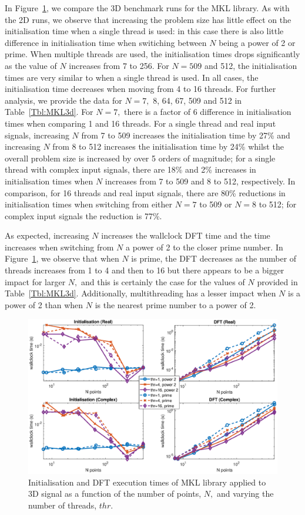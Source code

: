 \documentclass[a4paper]{article}
\begin{document}
In Figure~\ref{3DMKL}, we compare the 3D benchmark runs for the MKL
library. As with the 2D runs, we observe that increasing the problem
size has little effect on the initialisation time when a single thread
is used: in this case there is also little difference in
initialisation time when switiching between $N$ being a power of 2 or
prime. When multiple threads are used, the initialisation times drops
significantly as the value of $N$ increases from 7 to 256. For $N=509$
and 512, the initialisation times are very similar to when a single
thread is used. In all cases, the initialisation time decreases when
moving from 4 to 16 threads. For further analysis, we provide the data
for $N=7,$ 8, 64, 67, 509 and 512 in Table~\ref{Tbl:MKL3d}. For $N=7,$
there is a factor of 6 difference in initialisation times when
comparing 1 and 16 threads. For a single thread and real input
signals, increasing $N$ from 7 to 509 increases the initialisation
time by 27\% and increasing $N$ from 8 to 512 increases the
initialisation time by 24\% whilst the overall problem size is
increased by over 5 orders of magnitude; for a single thread with
complex input signals, there are 18\% and 2\% increases in
initialisation times when $N$ increases from 7 to 509 and 8 to 512,
respectively. In comparison, for 16 threads and real input signals,
there are 80\% reductions in initialisation times when switching from
either $N=7$ to 509 or $N=8$ to 512; for complex input signals the
reduction is 77\%.

As expected, increasing $N$ increases the wallclock DFT time and the
time increases when switching from $N$ a power of 2 to the closer
prime number. In Figure~\ref{3DMKL}, we observe that when $N$ is
prime, the DFT decreases as the number of threads increases from 1 to
4 and then to 16 but there appears to be a bigger impact for larger
$N,$ and this is certainly the case for the values of $N$ provided in
Table~\ref{Tbl:MKL3d}. Additionally, multithreading has a lesser
impact when $N$ is a power of 2 than when $N$ is the nearest prime
number to a power of 2.

\begin{figure}[htb]
    \centering
    \includegraphics[width=0.9\linewidth]{../results/mkl_3d_thr.eps}
  \caption{Initialisation and DFT execution times of MKL library applied to 3D signal as a function of the
    number of points, $N,$ and varying the number of threads, $thr.$ }
  \label{3DMKL}
\end{figure}
\end{document}
